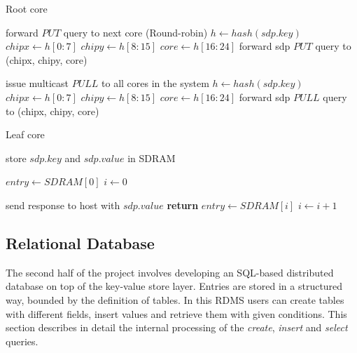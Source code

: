 \begin{algorithm}
\caption{Root core}
\label{alg:root}
\begin{algorithmic}[1]
			\State forward $PUT$ query to next core (Round-robin)
			\State $h \gets hash(sdp.key)$
			\State $chipx \gets h[0:7]$
			\State $chipy \gets h[8:15]$
			\State $core \gets h[16:24]$
			\State forward sdp $PUT$ query to (chipx, chipy, core)
		\EndIf
	\EndIf

			\State issue multicast $PULL$ to all cores in the system
			\State $h \gets hash(sdp.key)$
			\State $chipx \gets h[0:7]$
			\State $chipy \gets h[8:15]$
			\State $core \gets h[16:24]$
			\State forward sdp $PULL$ query to (chipx, chipy, core)
		\EndIf
	\EndIf
\EndProcedure
\end{algorithmic}
\end{algorithm}

\begin{algorithm}
\caption{Leaf core}
\label{alg:leaf}
\begin{algorithmic}[1]
		\State store $sdp.key$ and $sdp.value$ in SDRAM
	\EndIf

		\State $entry \gets SDRAM[0]$
		\State $i \gets 0$		
		
				\State send response to host with $sdp.value$
				\State \textbf{return}
			\EndIf
			\State $entry \gets SDRAM[i]$
			\State $i \gets i+1$
      	\EndWhile
	\EndIf
\EndProcedure
\end{algorithmic}
\end{algorithm}

\subsection{Relational Database}
The second half of the project involves developing an SQL-based distributed database on top of the key-value store layer. Entries are stored in a structured way, bounded by the definition of tables. In this RDMS users can create tables with different fields, insert values and retrieve them with given conditions. This section describes in detail the internal processing of the \textit{create}, \textit{insert} and \textit{select} queries. 

